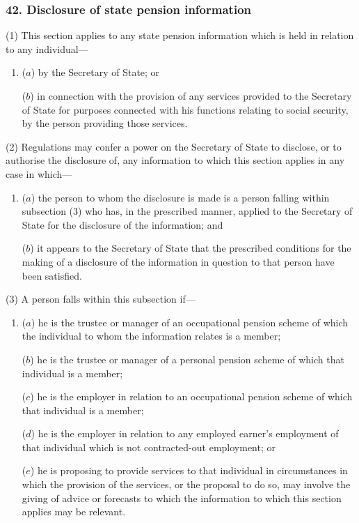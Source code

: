 \documentclass[12pt,a4paper]{article}
\begin{document}
\subsubsection{42. Disclosure of state pension information}

(1) This section applies to any state pension information which is held in relation to any individual—
\begin{enumerate}\item[]
($a$) by the Secretary of State; or

($b$) in connection with the provision of any services provided to the Secretary of State for purposes connected with his functions relating to social security, by the person providing those services.
\end{enumerate}

(2) Regulations may confer a power on the Secretary of State to disclose, or to authorise the disclosure of, any information to which this section applies in any case in which—
\begin{enumerate}\item[]
($a$) the person to whom the disclosure is made is a person falling within subsection (3)  who has, in the prescribed manner, applied to the Secretary of State for the disclosure of the information; and

($b$) it appears to the Secretary of State that the prescribed conditions for the making of a disclosure of the information in question to that person have been satisfied.
\end{enumerate}

(3) A person falls within this subsection if—
\begin{enumerate}\item[]
($a$) he is the trustee or manager of an occupational pension scheme of which the individual to whom the information relates is a member;

($b$) he is the trustee or manager of a personal pension scheme of which that individual is a member;

($c$) he is the employer in relation to an occupational pension scheme of which that individual is a member;

($d$) he is the employer in relation to any employed earner’s employment of that individual which is not contracted-out employment; or

($e$) he is proposing to provide services to that individual in circumstances in which the provision of the services, or the proposal to do so, may involve the giving of advice or forecasts to which the information to which this section applies may be relevant.
\end{enumerate}
\end{document}
